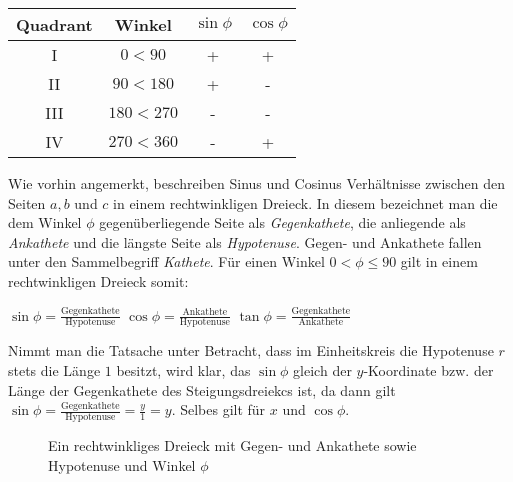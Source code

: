 \begin{table}[h!]
	\begin{tabular}{c | c | c | c}
		Quadrant & Winkel & $\sin \phi$ & $\cos \phi$
		\\ \hline
		I & $0 < 90$ & + & +
		\\ 
		II & $90 < 180$ & + & -
		\\
		III & $180 < 270$ & - & -
		\\
		IV & $270 < 360$ & - & +
		\\
	\end{tabular}
\end{table}


Wie vorhin angemerkt, beschreiben Sinus und Cosinus Verh\"{a}ltnisse zwischen den Seiten $a, b$ und $c$ in einem rechtwinkligen Dreieck. In diesem bezeichnet man die dem Winkel $\phi$ gegen\"{u}berliegende Seite als \emph{Gegenkathete}, die anliegende als \emph{Ankathete} und die l\"{a}ngste Seite als \emph{Hypotenuse}. Gegen- und Ankathete fallen unter den Sammelbegriff \emph{Kathete}. F\"{u}r einen Winkel $0 < \phi \leq 90$ gilt in einem rechtwinkligen Dreieck somit:

\begin{center}
$\sin \phi = \frac{\text{Gegenkathete}}{\text{Hypotenuse}}$
\hspace{1cm}
$\cos \phi = \frac{\text{Ankathete}}{\text{Hypotenuse}}$
\hspace{1cm}
$\tan \phi = \frac{\text{Gegenkathete}}{\text{Ankathete}}$
\end{center}

Nimmt man die Tatsache unter Betracht, dass im Einheitskreis die Hypotenuse $r$ stets die L\"{a}nge $1$ besitzt, wird klar, das $\sin \phi$ gleich der $y$-Koordinate bzw. der L\"{a}nge der Gegenkathete des Steigungsdreiekcs ist, da dann gilt $\sin \phi = \frac{\text{Gegenkathete}}{\text{Hypotenuse}} = \frac{y}{1} = y$. Selbes gilt f\"{u}r $x$ und $\cos \phi$.


\begin{figure}[t!]
	\caption*{Ein rechtwinkliges Dreieck mit Gegen- und Ankathete sowie Hypotenuse und Winkel $\phi$}
\end{figure}

